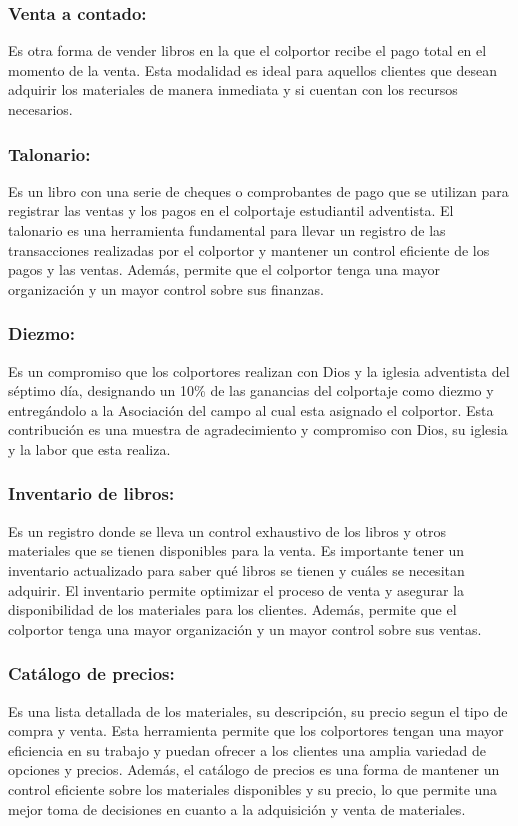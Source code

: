 \documentclass[runningheads]{llncs}
\begin{document}
            \subsubsection{Venta a contado: }Es otra forma de vender libros en la que el colportor recibe el pago total en el momento de la venta. Esta modalidad es ideal para aquellos clientes que desean adquirir los materiales de manera inmediata y si cuentan con los recursos necesarios. 

            \subsubsection{Talonario: }Es un libro con una serie de cheques o comprobantes de pago que se utilizan para registrar las ventas y los pagos en el colportaje estudiantil adventista. El talonario es una herramienta fundamental para llevar un registro de las transacciones realizadas por el colportor y mantener un control eficiente de los pagos y las ventas. Además, permite que el colportor tenga una mayor organización y un mayor control sobre sus finanzas.

            \subsubsection{Diezmo: }Es un compromiso que los colportores realizan con Dios y la iglesia adventista del séptimo día, designando un 10\% de las ganancias del colportaje como diezmo y entregándolo a la Asociación del campo al cual esta asignado el colportor. Esta contribución es una muestra de agradecimiento y compromiso con Dios, su iglesia y la labor que esta realiza. 

            \subsubsection{Inventario de libros: }Es un registro donde se lleva un control exhaustivo de los libros y otros materiales que se tienen disponibles para la venta. Es importante tener un inventario actualizado para saber qué libros se tienen y cuáles se necesitan adquirir. El inventario permite optimizar el proceso de venta y asegurar la disponibilidad de los materiales para los clientes. Además, permite que el colportor tenga una mayor organización y un mayor control sobre sus ventas.

            \subsubsection{Catálogo de precios: }Es una lista detallada de los materiales, su descripción, su precio segun el tipo de compra y venta. Esta herramienta permite que los colportores tengan una mayor eficiencia en su trabajo y puedan ofrecer a los clientes una amplia variedad de opciones y precios. Además, el catálogo de precios es una forma de mantener un control eficiente sobre los materiales disponibles y su precio, lo que permite una mejor toma de decisiones en cuanto a la adquisición y venta de materiales.
\end{document}
